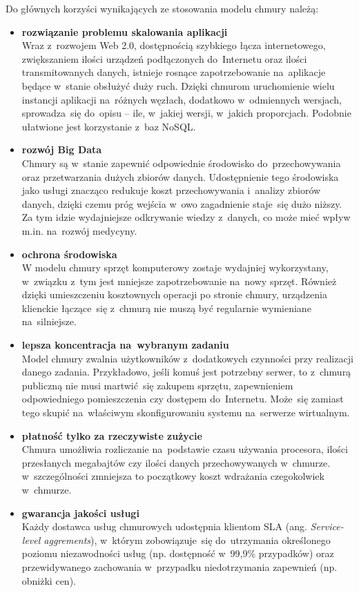 \documentclass[12pt,a4paper,twoside,titlepage,openright]{book}
\begin{document}
Do głównych korzyści wynikających ze stosowania modelu chmury należą:
\begin{itemize}
\item \textbf{rozwiązanie problemu skalowania aplikacji }\\
Wraz z~rozwojem Web 2.0, dostępnością szybkiego łącza internetowego, zwiększaniem ilości urządzeń podłączonych do~Internetu oraz ilości transmitowanych danych, istnieje rosnące zapotrzebowanie na~aplikacje będące w~stanie obsłużyć duży ruch. Dzięki chmurom uruchomienie wielu instancji aplikacji na~różnych węzłach, dodatkowo w~odmiennych wersjach, sprowadza~się do~opisu -- ile, w~jakiej wersji, w~jakich proporcjach.\cite{kubernetesOreily} Podobnie ułatwione jest korzystanie z~baz NoSQL.

\item \textbf{rozwój Big Data} \\
Chmury są w~stanie zapewnić odpowiednie środowisko do~przechowywania oraz przetwarzania dużych zbiorów danych. Udostępnienie tego środowiska jako usługi znacząco redukuje koszt przechowywania i~analizy zbiorów danych, dzięki czemu próg wejścia w~owo zagadnienie staje~się dużo niższy. Za tym idzie wydajniejsze odkrywanie wiedzy z~danych, co może mieć wpływ m.in. na~rozwój medycyny.

\item \textbf{ochrona środowiska} \\
W modelu chmury sprzęt komputerowy zostaje wydajniej wykorzystany, w~związku z~tym jest mniejsze zapotrzebowanie na~nowy sprzęt. Również dzięki umieszczeniu kosztownych operacji po stronie chmury, urządzenia klienckie łączące~się z~chmurą nie muszą być regularnie wymieniane na~silniejsze.

\item \textbf{lepsza koncentracja na~wybranym zadaniu} \\
Model chmury zwalnia użytkowników z~dodatkowych czynności przy realizacji danego zadania. Przykładowo, jeśli komuś jest potrzebny serwer, to z~chmurą publiczną nie musi martwić~się zakupem sprzętu, zapewnieniem odpowiedniego pomieszczenia czy dostępem do~Internetu. Może~się zamiast tego skupić na~właściwym skonfigurowaniu systemu na~serwerze wirtualnym. 

\item \textbf{płatność tylko za rzeczywiste zużycie} \\
Chmura umożliwia rozliczanie na~podstawie czasu używania procesora, ilości przesłanych megabajtów czy ilości danych przechowywanych w~chmurze. w~szczególności zmniejsza to początkowy koszt wdrażania czegokolwiek w~chmurze.

\item \textbf{gwarancja jakości usługi} \\
Każdy dostawca usług chmurowych udostępnia klientom SLA (ang. \textit{Service-level aggrements}), w~którym zobowiązuje~się do~utrzymania określonego poziomu niezawodności usług (np. dostępność w~99,9\% przypadków) oraz przewidywanego zachowania w~przypadku niedotrzymania zapewnień (np. obniżki cen).

\end{itemize}
\end{document}
